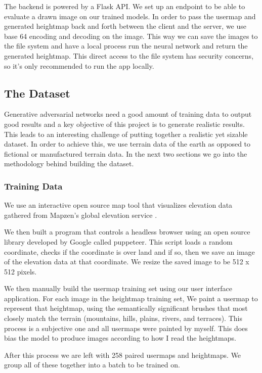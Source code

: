 \documentclass[twocolumn]{article}
\begin{document}
	The backend is powered by a Flask API. We set up an endpoint to be able to evaluate a drawn image on our trained models. In order to pass the usermap and generated heightmap back and forth between the client and the server, we use base 64 encoding and decoding on the image. This way we can save the images to the file system and have a local process run the neural network and return the generated heightmap. This direct access to the file system has security concerns, so it's only recommended to run the app locally.
	
	\subsection{The Dataset}
	
	Generative adversarial networks need a good amount of training data to output good results and a key objective of this project is to generate realistic results. This leads to an interesting challenge of putting together a realistic yet sizable dataset. In order to achieve this, we use terrain data of the earth as opposed to fictional or manufactured terrain data. In the next two sections we go into the methodology behind building the dataset.

	\subsubsection{Training Data}
	
	We use an interactive open source map tool that visualizes elevation data gathered from Mapzen's global elevation service \cite{richardson2016mapzen}.
	
	We then built a program that controls a headless browser using an open source library developed by Google called puppeteer. This script loads a random coordinate, checks if the coordinate is over land and if so, then we save an image of the elevation data at that coordinate. We resize the saved image to be 512 x 512 pixels.
	
	We then manually build the usermap training set using our user interface application. For each image in the heightmap training set, We paint a usermap to represent that heightmap, using the semantically significant brushes that most closely match the terrain (mountains, hills, plains, rivers, and terraces). This process is a subjective one and all usermaps were painted by myself. This does bias the model to produce images according to how I read the heightmaps.

	After this process we are left with 258 paired usermaps and heightmaps. We group all of these together into a batch to be trained on.
\end{document}
